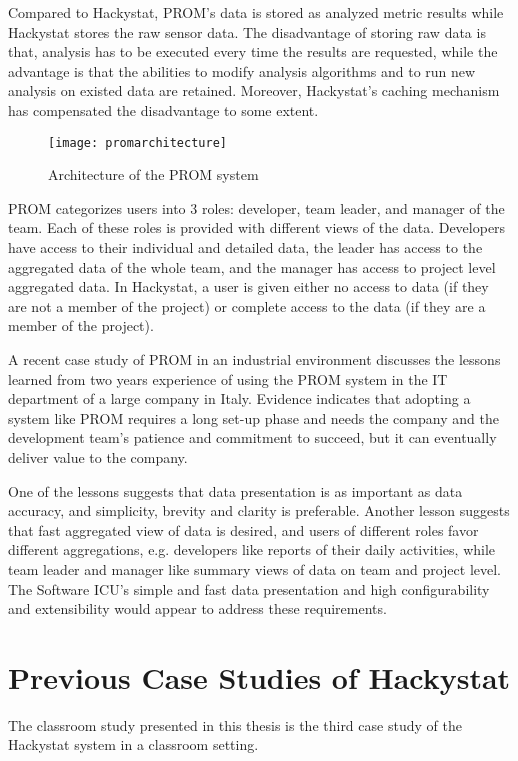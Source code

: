 Compared to Hackystat, PROM's data is stored as analyzed metric results while Hackystat stores the raw sensor data. The disadvantage of storing raw data is that, analysis has to be executed every time the results are requested, while the advantage is that the abilities to modify analysis algorithms and to run new analysis on existed data are retained. Moreover, Hackystat's caching mechanism has compensated the disadvantage to some extent.

\begin{figure}[htbp]
     \centering
     \texttt{[image: promarchitecture]}
     \caption{Architecture of the PROM system}
     \label{fig:promarchitecture}
\end{figure}

PROM categorizes users into 3 roles: developer, team leader, and manager of the team. Each of these roles is provided with different views of the data. Developers have access to their individual and detailed data, the leader has access to the aggregated data of the whole team, and the manager has access to project level aggregated data. In Hackystat, a user is given either no access to data (if they are not a member of the project) or complete access to the data (if they are a member of the project).

A recent case study of PROM in an industrial environment\cite{prom09} discusses the lessons learned from two years experience of using the PROM system in the IT department of a large company in Italy. Evidence indicates that adopting a system like PROM requires a long set-up phase and needs the company and the development team's patience and commitment to succeed, but it can eventually deliver value to the company. 

One of the lessons suggests that data presentation is as important as data accuracy, and simplicity, brevity and clarity is preferable. Another lesson suggests that fast aggregated view of data is desired, and users of different roles favor different aggregations, e.g. developers like reports of their daily activities, while team leader and manager like summary views of data on team and project level. The Software ICU's simple and fast data presentation and high configurability and extensibility would appear to address these requirements.


\section {Previous Case Studies of Hackystat}
The classroom study presented in this thesis is the third case study of the Hackystat system in a classroom setting. 


